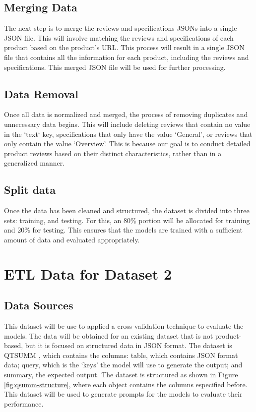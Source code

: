\subsection{Merging Data}
The next step is to merge the reviews and specifications JSONs into a single JSON file. This will involve matching the reviews and specifications of each product based on the product's URL. This process will result in a single JSON file that contains all the information for each product, including the reviews and specifications. This merged JSON file will be used for further processing.

\subsection{Data Removal}
Once all data is normalized and merged, the process of removing duplicates and unnecessary data begins. This will include deleting reviews that contain no value in the `text` key, specifications that only have the value `General', or reviews that only contain the value `Overview'. This is because our goal is to conduct detailed product reviews based on their distinct characteristics, rather than in a generalized manner.

\subsection{Split data}
Once the data has been cleaned and structured, the dataset is divided into three sets: training, and testing. For this, an 80\% portion will be allocated for training and 20\% for testing. This ensures that the models are trained with a sufficient amount of data and evaluated appropriately.

\section{ETL Data for Dataset 2}
\subsection{Data Sources}
This dataset will be use to applied a cross-validation technique to evaluate the models. The data will be obtained for an existing dataset that is not product-based, but it is focused on structured data in JSON format. The dataset is QTSUMM \cite{zhao2023qtsummqueryfocusedsummarizationtabular}, which contains the columns: table, which contains JSON format data; query, which is the `keys' the model will use to generate the output; and summary, the expected output. The dataset is structured as shown in Figure \ref{fig:qsumm-structure}, where each object contains the columns especified before. This dataset will be used to generate prompts for the models to evaluate their performance.

